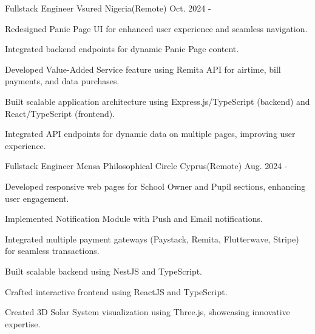 

\begin{cventries}


\cventry
{Fullstack Engineer} %
{Vsured} %
{Nigeria(Remote)} %
{Oct. 2024 - } %
{
  \begin{cvitems}
    \item {Redesigned Panic Page UI for enhanced user experience and seamless navigation.}
    \item {Integrated backend endpoints for dynamic Panic Page content.} 
    \item {Developed Value-Added Service feature using Remita API for airtime, bill payments, and data purchases.}
    \item {Built scalable application architecture using Express.js/TypeScript (backend) and React/TypeScript (frontend).}
    \item {Integrated API endpoints for dynamic data on multiple pages, improving user experience.}
  \end{cvitems}
}
\cventry
{Fullstack Engineer} %
{Mensa Philosophical Circle} %
{Cyprus(Remote)} %
{Aug. 2024 - } %
{
  \begin{cvitems}
    \item {Developed responsive web pages for School Owner and Pupil sections, enhancing user engagement.}
    \item {Implemented Notification Module with Push and Email notifications.}
    \item {Integrated multiple payment gateways (Paystack, Remita, Flutterwave, Stripe) for seamless transactions.}
    \item {Built scalable backend using NestJS and TypeScript.}
    \item {Crafted interactive frontend using ReactJS and TypeScript.}
    \item {Created 3D Solar System visualization using Three.js, showcasing innovative expertise.}
  \end{cvitems}
}
\end{cventries}
